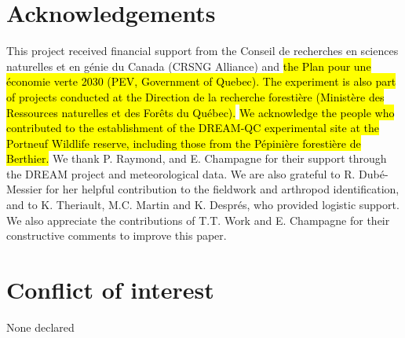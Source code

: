 \clearpage

\section*{Acknowledgements}
\label{sec:acknowl1}

This project received financial support from the Conseil de recherches en sciences naturelles et en génie du Canada (CRSNG Alliance) 
and \hl{the Plan pour une économie verte 2030 (PEV, Government of Quebec). The experiment is also part of projects conducted at the Direction de la recherche forestière (Ministère des Ressources naturelles et des Forêts du Québec). }
\hl{We acknowledge the people who contributed to the establishment of the DREAM-QC experimental site at the Portneuf Wildlife reserve, including those from the Pépinière forestière de Berthier. }
We thank P. Raymond, and E. Champagne for their support through the DREAM project and meteorological data. 
We are also grateful to R. Dubé-Messier for her helpful contribution to the fieldwork and arthropod identification, and to K. Theriault, M.C. Martin and K. Després, who provided logistic support. 
We also appreciate the contributions of T.T. Work and E. Champagne for their constructive comments to improve this paper. 


\section*{Conflict of interest}
\label{sec:conflict1}

None declared


\cleardoublepage

\begin{otherlanguage}{english}

\end{otherlanguage}
